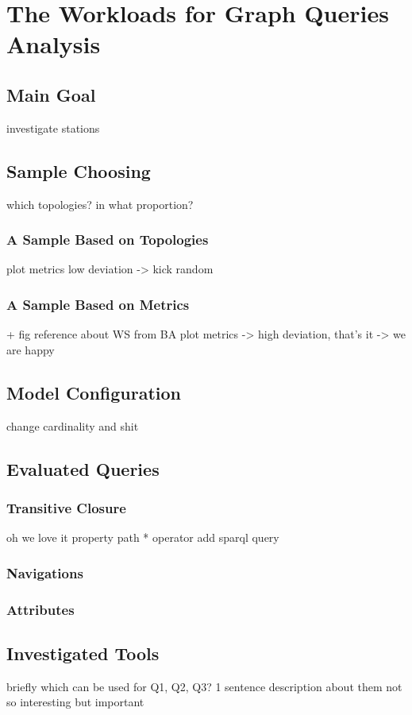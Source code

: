 \section{The Workloads for Graph Queries Analysis}

\subsection{Main Goal}
investigate stations
\subsection{Sample Choosing}
which topologies? in what proportion?
\subsubsection{A Sample Based on Topologies}

plot metrics low deviation -> kick random

\subsubsection{A Sample Based on Metrics}
+ fig reference about WS from BA
plot metrics -> high deviation, that's it -> we are happy

\subsection{Model Configuration}
change cardinality and shit
\subsection{Evaluated Queries}

\subsubsection{Transitive Closure}
oh we love it
property path * operator
add sparql query
\subsubsection{Navigations}
\subsubsection{Attributes}
\subsection{Investigated Tools} briefly
which can be used for Q1, Q2, Q3? 
1 sentence description about them not so interesting but important
